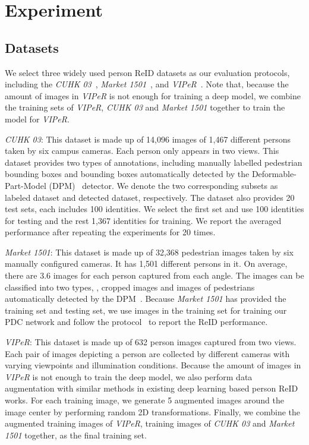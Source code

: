 \documentclass[10pt,twocolumn,letterpaper]{article}
\begin{document}
\section{Experiment}
\subsection{Datasets}
\label{sec:datsets}
We select three widely used person ReID datasets as our evaluation protocols, including the \emph{CUHK 03}~\cite{li2014deepreid}, \emph{Market 1501}~\cite{zheng2015scalable}, and \emph{VIPeR}~\cite{gray2007evaluating}. Note that, because the amount of images in \emph{VIPeR} is not enough for training a deep model, we combine the training sets of \emph{VIPeR}, \emph{CUHK 03} and \emph{Market 1501} together to train the model for \emph{VIPeR}.

{\emph{CUHK 03}}:
This dataset is made up of 14,096 images of 1,467 different persons taken by six campus cameras. Each person only appears in two views. This dataset provides two types of annotations, including manually labelled pedestrian bounding boxes and bounding boxes automatically detected by the Deformable-Part-Model (DPM)~\cite{felzenszwalb2008discriminatively} detector. We denote the two corresponding subsets as labeled dataset and detected dataset, respectively. The dataset also provides 20 test sets, each includes 100 identities. We select the first set and use 100 identities for testing and the rest 1,367 identities for training. We report the averaged performance after repeating the experiments for 20 times.

{\emph{Market 1501}:} This dataset is made up of 32,368 pedestrian images taken by six manually configured cameras. It has 1,501 different persons in it. On average, there are 3.6 images for each person captured from each angle. The images can be classified into two types, \ie, cropped images and images of pedestrians automatically detected by the DPM~\cite{felzenszwalb2008discriminatively}. Because \emph{Market 1501} has provided the training set and testing set, we use images in the training set for training our PDC network and follow the protocol~\cite{zheng2015scalable} to report the ReID performance.

{\emph{VIPeR}:} This dataset is made up of 632 person images captured from two views. Each pair of images depicting a person are collected by different cameras with varying viewpoints and illumination conditions. Because the amount of images in \emph{VIPeR} is not enough to train the deep model, we also perform data augmentation with similar methods in existing deep learning based person ReID works. For each training image, we generate 5 augmented images around the image center by performing random 2D transformations. Finally, we combine the augmented training images of \emph{VIPeR}, training images of \emph{CUHK 03} and \emph{Market 1501} together, as the final training set.
\end{document}
